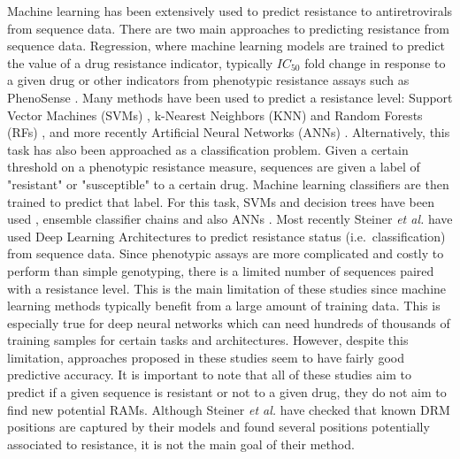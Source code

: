 \documentclass[
  11pt,
  twoside,
  BCOR=10mm,
  listof=totoc]{scrbook}
\begin{document}
Machine learning has been extensively used to predict resistance to
antiretrovirals from sequence data. There are two main approaches to
predicting resistance from sequence data. Regression, where machine
learning models are trained to predict the value of a drug resistance
indicator, typically \(IC_{50}\) fold change in response to a given drug
\autocite{lengauerBioinformaticsassistedAntiHIVTherapy2006} or other indicators
from phenotypic resistance assays such as PhenoSense
\autocite{zhangComparisonPrecisionSensitivity2005a}. Many methods have been used
to predict a resistance level: Support Vector Machines (SVMs)
\autocite{beerenwinkelGeno2phenoEstimatingPhenotypic2003b}, k-Nearest Neighbors
(KNN) and Random Forests (RFs) \autocite{shenAutomatedPredictionHIV2016a}, and
more recently Artificial Neural Networks (ANNs)
\autocite{yuPredictionHIVDrug2014a,sheikamamuddyImprovingFoldResistance2017b}.
Alternatively, this task has also been approached as a classification
problem. Given a certain threshold on a phenotypic resistance measure,
sequences are given a label of "resistant" or "susceptible" to a
certain drug. Machine learning classifiers are then trained to predict
that label. For this task, SVMs and decision trees have been used
\autocite{beerenwinkelGeno2phenoInterpretingGenotypic2001,arayaSupportVectorMachine2009},
ensemble classifier chains
\autocite{riemenschneiderExploitingHIV1Protease2016a,heiderMultilabelClassificationExploiting2013b}
and also ANNs \autocite{draghiciPredictingHIVDrug2003}. Most recently Steiner
\emph{et al.} \autocite{steinerDrugResistancePrediction2020a} have used Deep Learning
Architectures to predict resistance status (i.e.~classification) from
sequence data. Since phenotypic assays are more complicated and costly
to perform than simple genotyping, there is a limited number of
sequences paired with a resistance level. This is the main limitation of
these studies since machine learning methods typically benefit from a
large amount of training data. This is especially true for deep neural
networks which can need hundreds of thousands of training samples for
certain tasks and architectures. However, despite this limitation,
approaches proposed in these studies seem to have fairly good predictive
accuracy. It is important to note that all of these studies aim to
predict if a given sequence is resistant or not to a given drug, they do
not aim to find new potential RAMs. Although Steiner \emph{et al.}
\autocite{steinerDrugResistancePrediction2020a} have checked that known DRM
positions are captured by their models and found several positions
potentially associated to resistance, it is not the main goal of their
method.
\end{document}
